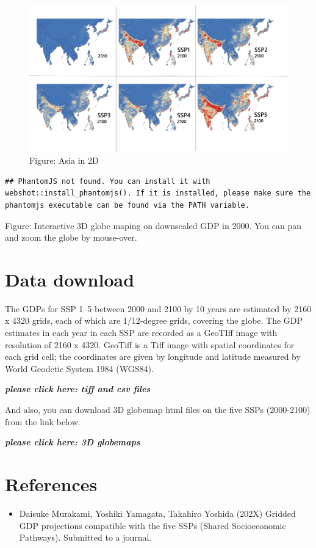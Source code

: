 \documentclass[]{book}
\providecommand{\tightlist}{%
  \setlength{\itemsep}{0pt}\setlength{\parskip}{0pt}}
\begin{document}
\begin{figure}
\centering
\includegraphics{Asia.png}
\caption{Figure: Asia in 2D}
\end{figure}

\begin{verbatim}
## PhantomJS not found. You can install it with webshot::install_phantomjs(). If it is installed, please make sure the phantomjs executable can be found via the PATH variable.
\end{verbatim}

\hypertarget{ntqc18RvJH}{}

Figure: Interactive 3D globe maping on downscaled GDP in 2000. You can pan and zoom the globe by mouse-over.

\hypertarget{data-download}{%
\section{Data download}\label{data-download}}

The GDPs for SSP 1--5 between 2000 and 2100 by 10 years are estimated by 2160 x 4320 grids, each of which are 1/12-degree grids, covering the globe. The GDP estimates in each year in each SSP are recorded as a GeoTIff image with resolution of 2160 x 4320. GeoTiff is a Tiff image with spatial coordinates for each grid cell; the coordinates are given by longitude and latitude measured by World Geodetic System 1984 (WGS84).

\textbf{\emph{please click here: tiff and csv files}}

And also, you can download 3D globemap html files on the five SSPs (2000-2100) from the link below.

\textbf{\emph{please click here: 3D globemaps}}

\hypertarget{references}{%
\section{References}\label{references}}

\begin{itemize}
\tightlist
\item
  Daisuke Murakami, Yoshiki Yamagata, Takahiro Yoshida (202X) Gridded GDP projections compatible with the five SSPs (Shared Socioeconomic Pathways). Submitted to a journal.
\end{itemize}


\end{document}
